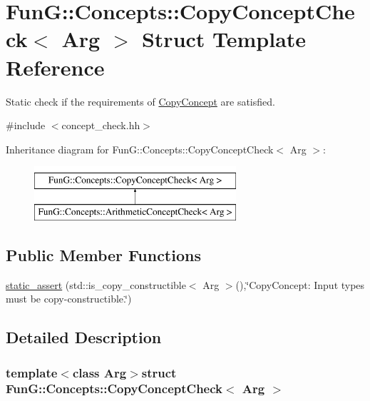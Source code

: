 \hypertarget{structFunG_1_1Concepts_1_1CopyConceptCheck}{\section{\-Fun\-G\-:\-:\-Concepts\-:\-:\-Copy\-Concept\-Check$<$ \-Arg $>$ \-Struct \-Template \-Reference}
\label{structFunG_1_1Concepts_1_1CopyConceptCheck}
}


\-Static check if the requirements of \hyperlink{structFunG_1_1Concepts_1_1CopyConcept}{\-Copy\-Concept} are satisfied.  




{\ttfamily \#include $<$concept\-\_\-check.\-hh$>$}

\-Inheritance diagram for \-Fun\-G\-:\-:\-Concepts\-:\-:\-Copy\-Concept\-Check$<$ \-Arg $>$\-:\begin{figure}[H]
\begin{center}
\leavevmode
\includegraphics[height=2.000000cm]{structFunG_1_1Concepts_1_1CopyConceptCheck}
\end{center}
\end{figure}
\subsection*{\-Public \-Member \-Functions}
\begin{DoxyCompactItemize}
\item 
\hyperlink{structFunG_1_1Concepts_1_1CopyConceptCheck_aa471b5bea12828b79bc4d365745d3373}{static\-\_\-assert} (std\-::is\-\_\-copy\-\_\-constructible$<$ \-Arg $>$(),\char`\"{}\-Copy\-Concept\-: \-Input types must be copy-\/constructible.\char`\"{})
\end{DoxyCompactItemize}


\subsection{\-Detailed \-Description}
\subsubsection*{template$<$class \-Arg$>$struct Fun\-G\-::\-Concepts\-::\-Copy\-Concept\-Check$<$ Arg $>$}

